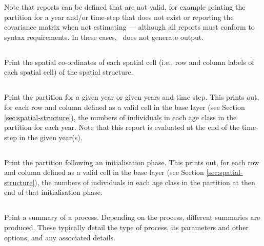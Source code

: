 Note that reports can be defined that are  not valid, for example printing the partition for a year and/or time-step that does not exist or reporting the covariance matrix when not estimating --- although  all reports must conform to syntax requirements. In these cases, \SPM\ does not generate output.

\subsection{}

Print the spatial co-ordinates of each spatial cell (i.e., row and column labels of each spatial cell) of the spatial structure.

\subsection{}

Print the partition for a given year or given years and time step. This prints out, for each row and column defined as a valid cell in the base layer (see Section \ref{sec:spatial-structure}), the numbers of individuals in each age class in the partition for each year. Note that this report is evaluated at the end of the time-step in the given year(s).

\subsection{}

Print the partition following an initialisation phase. This prints out, for each row and column defined as a valid cell in the base layer (see Section \ref{sec:spatial-structure}), the numbers of individuals in each age class in the partition at then end of that initialisation phase.

\subsection{}

Print a summary of a process. Depending on the process, different summaries are produced. These typically detail the type of process, its parameters and other options, and any associated details.

\subsection{}

